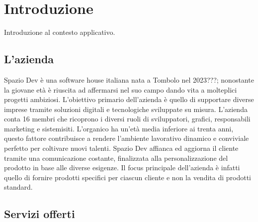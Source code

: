 \chapter{Introduzione}
\label{cap:introduzione}

Introduzione al contesto applicativo.\\

%
%
%
%

\section{L'azienda}

Spazio Dev è una software house italiana nata a Tombolo nel 2023???; nonostante la giovane età è riuscita ad affermarsi nel suo campo dando vita a molteplici progetti ambiziosi. L'obiettivo primario dell'azienda è quello di supportare diverse imprese tramite soluzioni digitali e tecnologiche sviluppate su misura.
L'azienda conta 16 membri che ricoprono i diversi ruoli di sviluppatori, grafici, responsabili marketing e sistemisiti. L'organico ha un'età media inferiore ai trenta anni, questo fattore contribuisce a rendere l'ambiente lavorativo dinamico e conviviale perfetto per coltivare nuovi talenti.
Spazio Dev affianca ed aggiorna il cliente tramite una comunicazione costante, finalizzata alla personalizzazione del prodotto in base alle diverse esigenze. Il focus principale dell'azienda è infatti quello di fornire prodotti specifici per ciascun cliente e non la vendita di prodotti standard.

\section{Servizi offerti}

